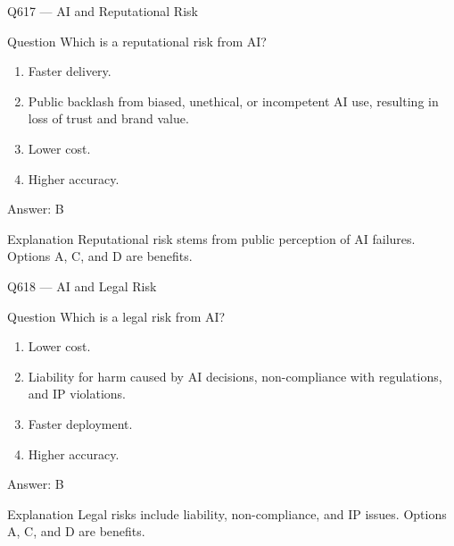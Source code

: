 \documentclass[aspectratio=169,8pt]{beamer}
\begin{document}
	\begin{frame}{Q617 --- AI and Reputational Risk}
		\begin{block}{Question}
			Which is a reputational risk from AI?
			\begin{enumerate}
				\item Faster delivery.
				\item Public backlash from biased, unethical, or incompetent AI use, resulting in loss of trust and brand value.
				\item Lower cost.
				\item Higher accuracy.
			\end{enumerate}
		\end{block}
		\begin{exampleblock}{Answer: B}\end{exampleblock}
		\begin{block}{Explanation}
			Reputational risk stems from public perception of AI failures. Options A, C, and D are benefits.
		\end{block}
	\end{frame}
	
	\begin{frame}{Q618 --- AI and Legal Risk}
		\begin{block}{Question}
			Which is a legal risk from AI?
			\begin{enumerate}
				\item Lower cost.
				\item Liability for harm caused by AI decisions, non-compliance with regulations, and IP violations.
				\item Faster deployment.
				\item Higher accuracy.
			\end{enumerate}
		\end{block}
		\begin{exampleblock}{Answer: B}\end{exampleblock}
		\begin{block}{Explanation}
			Legal risks include liability, non-compliance, and IP issues. Options A, C, and D are benefits.
		\end{block}
	\end{frame}
	
\end{document}

